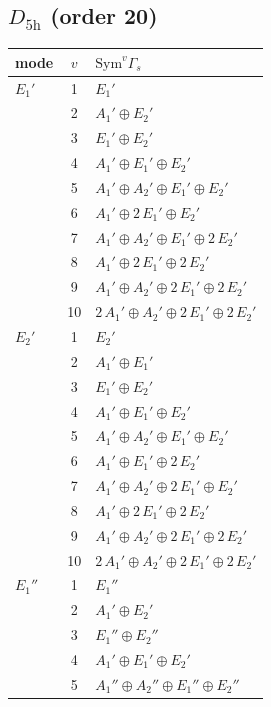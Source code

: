 \documentclass[11pt]{article}
\begin{document}
\subsection*{$D_{5\mathrm{h}}$ \quad (order 20)}
\begin{longtable}{l c p{}}
\hline mode & $v$ & $\mathrm{Sym}^v\Gamma_s$\\ \hline\endhead
$E_{1}'$ & 1 & $E_{1}'$\\
 & 2 & $A_{1}'\oplus E_{2}'$\\
 & 3 & $E_{1}'\oplus E_{2}'$\\
 & 4 & $A_{1}'\oplus E_{1}'\oplus E_{2}'$\\
 & 5 & $A_{1}'\oplus A_{2}'\oplus E_{1}'\oplus E_{2}'$\\
 & 6 & $A_{1}'\oplus 2\,E_{1}'\oplus E_{2}'$\\
 & 7 & $A_{1}'\oplus A_{2}'\oplus E_{1}'\oplus 2\,E_{2}'$\\
 & 8 & $A_{1}'\oplus 2\,E_{1}'\oplus 2\,E_{2}'$\\
 & 9 & $A_{1}'\oplus A_{2}'\oplus 2\,E_{1}'\oplus 2\,E_{2}'$\\
 & 10 & $2\,A_{1}'\oplus A_{2}'\oplus 2\,E_{1}'\oplus 2\,E_{2}'$\\
\hline
$E_{2}'$ & 1 & $E_{2}'$\\
 & 2 & $A_{1}'\oplus E_{1}'$\\
 & 3 & $E_{1}'\oplus E_{2}'$\\
 & 4 & $A_{1}'\oplus E_{1}'\oplus E_{2}'$\\
 & 5 & $A_{1}'\oplus A_{2}'\oplus E_{1}'\oplus E_{2}'$\\
 & 6 & $A_{1}'\oplus E_{1}'\oplus 2\,E_{2}'$\\
 & 7 & $A_{1}'\oplus A_{2}'\oplus 2\,E_{1}'\oplus E_{2}'$\\
 & 8 & $A_{1}'\oplus 2\,E_{1}'\oplus 2\,E_{2}'$\\
 & 9 & $A_{1}'\oplus A_{2}'\oplus 2\,E_{1}'\oplus 2\,E_{2}'$\\
 & 10 & $2\,A_{1}'\oplus A_{2}'\oplus 2\,E_{1}'\oplus 2\,E_{2}'$\\
\hline
$E_{1}''$ & 1 & $E_{1}''$\\
 & 2 & $A_{1}'\oplus E_{2}'$\\
 & 3 & $E_{1}''\oplus E_{2}''$\\
 & 4 & $A_{1}'\oplus E_{1}'\oplus E_{2}'$\\
 & 5 & $A_{1}''\oplus A_{2}''\oplus E_{1}''\oplus E_{2}''$\\

\end{longtable}
\end{document}
